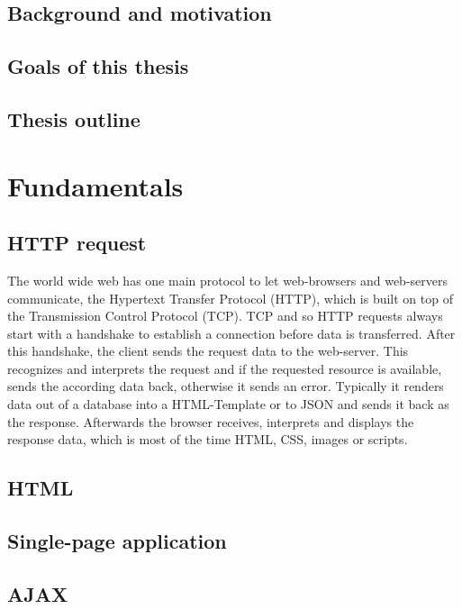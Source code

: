 \documentclass[f,bachelor,binding,twoside,palatino]{WeSTthesis}
\def \ajax {AJAX}
\def \httpRequest {HTTP request}
\def \html {HTML}
\def \SinglePageApplication {Single-page application}
\begin{document}
\subsection{Background and motivation}

\subsection{Goals of this thesis}

\subsection{Thesis outline}

\section{Fundamentals}
\subsection{\httpRequest{}}
The world wide web has one main protocol to let web-browsers and web-servers communicate, the Hypertext Transfer Protocol (HTTP), which is built on top of the Transmission Control Protocol (TCP).
TCP and so \httpRequest{}s always start with a handshake to establish a connection before data is transferred.
After this handshake, the client sends the request data to the web-server.
This recognizes and interprets the request and if the requested resource is available, sends the according data back, otherwise it sends an error.
Typically it renders data out of a database into a HTML-Template or to JSON and sends it back as the response.
Afterwards the browser receives, interprets and displays the response data, which is most of the time HTML, CSS, images or scripts.

\subsection{\html{}}

\subsection{\SinglePageApplication{}}

\subsection{\ajax{}}
\end{document}
